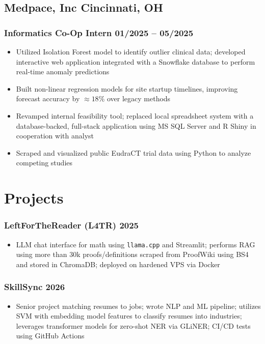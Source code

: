 \documentclass[10pt]{article} %
\begin{document}
\subsection{Medpace, Inc \hfill Cincinnati, OH}
\subsubsection{Informatics Co-Op Intern \hfill 01/2025 -- 05/2025}
\begin{itemize}
	\item Utilized Isolation Forest model to identify outlier clinical data; developed interactive web application integrated with a Snowflake database to perform real-time anomaly predictions
	\item Built non-linear regression models for site startup timelines, improving forecast accuracy by $\approx 18\%$ over legacy methods
	\item Revamped internal feasibility tool; replaced local spreadsheet system with a database-backed, full-stack application using MS SQL Server and R Shiny in cooperation with analyst
	\item Scraped and visualized public EudraCT trial data using Python to analyze competing studies
\end{itemize}

\section{Projects}
\subsubsection{LeftForTheReader (L4TR) \hfill 2025}
\begin{itemize}
	\item LLM chat interface for math using \verb|llama.cpp| and Streamlit; performs RAG using more than 30k proofs/definitions scraped from ProofWiki using BS4 and stored in ChromaDB; deployed on hardened VPS via Docker
\end{itemize}
\vspace{-7pt}
\subsubsection{SkillSync \hfill 2026}
\begin{itemize}
	\item Senior project matching resumes to jobs; wrote NLP and ML pipeline; utilizes SVM with embedding model features to classify resumes into industries; leverages transformer models for zero-shot NER via GLiNER; CI/CD tests using GitHub Actions
\end{itemize}
\vspace{-7pt}
\end{document}
